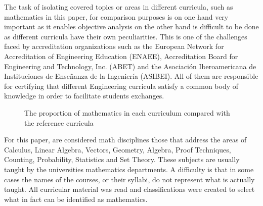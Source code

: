 \documentclass[conference]{IEEEtran}
\begin{document}
	The task of isolating covered topics or areas in different curricula, such as mathematics in this paper, for comparison purposes is on one hand very important as it enables objective analysis on the other hand is difficult to be done as different curricula have their own peculiarities. This is one of the challenges faced by accreditation organizations such as the European Network for Accreditation of Engineering Education (ENAEE), Accreditation Board for Engineering and Technology, Inc. (ABET) and the Asociación Iberoamericana de Instituciones de Enseñanza de la Ingeniería (ASIBEI). All of them are responsible for certifying that different Engineering curricula satisfy a common body of knowledge in order to facilitate students exchanges.
	

\begin{figure}[!t]
\centering
{}
\caption{The proportion of mathematics in each curriculum compared with the reference curricula}
\end{figure}

	For this paper, are considered math disciplines those that address the areas of Calculus, Linear Algebra, Vectors, Geometry, Algebra, Proof Techniques, Counting, Probability, Statistics and Set Theory. These subjects are usually taught by the universities mathematics departments. A difficulty is that in some cases the names of the courses, or their syllabi, do not represent what is actually taught. All curricular material was read and classifications were created to select what in fact can be identified as mathematics.
\end{document}
